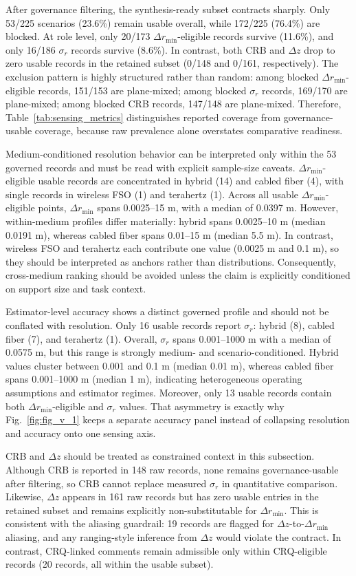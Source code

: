 \documentclass[lettersize,journal]{IEEEtran}
\begin{document}
After governance filtering, the synthesis-ready subset contracts sharply. Only 53/225 scenarios (23.6\%) remain usable overall, while 172/225 (76.4\%) are blocked. At role level, only 20/173 $\Delta r_{\min}$-eligible records survive (11.6\%), and only 16/186 $\sigma_r$ records survive (8.6\%). In contrast, both CRB and $\Delta z$ drop to zero usable records in the retained subset (0/148 and 0/161, respectively). The exclusion pattern is highly structured rather than random: among blocked $\Delta r_{\min}$-eligible records, 151/153 are plane-mixed; among blocked $\sigma_r$ records, 169/170 are plane-mixed; among blocked CRB records, 147/148 are plane-mixed. Therefore, Table~\ref{tab:sensing_metrics} distinguishes reported coverage from governance-usable coverage, because raw prevalence alone overstates comparative readiness.

Medium-conditioned resolution behavior can be interpreted only within the 53 governed records and must be read with explicit sample-size caveats. $\Delta r_{\min}$-eligible usable records are concentrated in hybrid (14) and cabled fiber (4), with single records in wireless FSO (1) and terahertz (1). Across all usable $\Delta r_{\min}$-eligible points, $\Delta r_{\min}$ spans 0.0025--15 m, with a median of 0.0397 m. However, within-medium profiles differ materially: hybrid spans 0.0025--10 m (median 0.0191 m), whereas cabled fiber spans 0.01--15 m (median 5.5 m). In contrast, wireless FSO and terahertz each contribute one value (0.0025 m and 0.1 m), so they should be interpreted as anchors rather than distributions. Consequently, cross-medium ranking should be avoided unless the claim is explicitly conditioned on support size and task context.

Estimator-level accuracy shows a distinct governed profile and should not be conflated with resolution. Only 16 usable records report $\sigma_r$: hybrid (8), cabled fiber (7), and terahertz (1). Overall, $\sigma_r$ spans 0.001--1000 m with a median of 0.0575 m, but this range is strongly medium- and scenario-conditioned. Hybrid values cluster between 0.001 and 0.1 m (median 0.01 m), whereas cabled fiber spans 0.001--1000 m (median 1 m), indicating heterogeneous operating assumptions and estimator regimes. Moreover, only 13 usable records contain both $\Delta r_{\min}$-eligible and $\sigma_r$ values. That asymmetry is exactly why Fig.~\ref{fig:fig_v_1} keeps a separate accuracy panel instead of collapsing resolution and accuracy onto one sensing axis.

CRB and $\Delta z$ should be treated as constrained context in this subsection. Although CRB is reported in 148 raw records, none remains governance-usable after filtering, so CRB cannot replace measured $\sigma_r$ in quantitative comparison. Likewise, $\Delta z$ appears in 161 raw records but has zero usable entries in the retained subset and remains explicitly non-substitutable for $\Delta r_{\min}$. This is consistent with the aliasing guardrail: 19 records are flagged for $\Delta z$-to-$\Delta r_{\min}$ aliasing, and any ranging-style inference from $\Delta z$ would violate the contract. In contrast, CRQ-linked comments remain admissible only within CRQ-eligible records (20 records, all within the usable subset).
\end{document}
